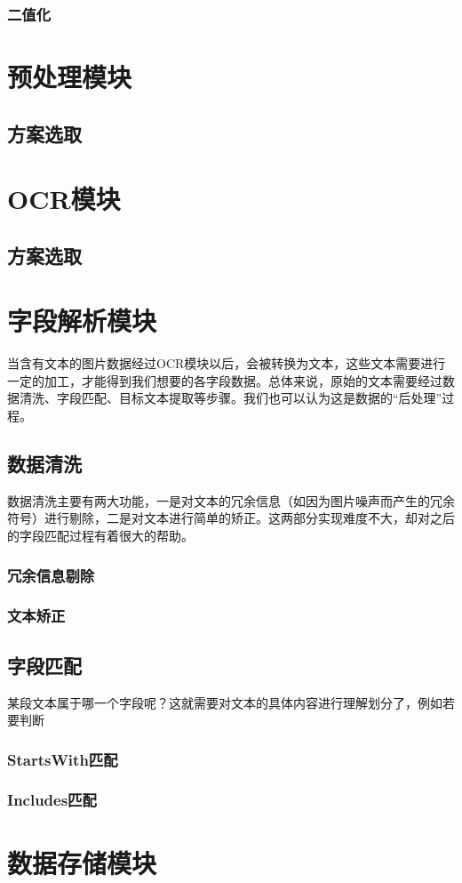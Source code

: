 \subsubsection*{二值化}
\label{sub:二值化}

\section{预处理模块}     %
\subsection{方案选取}


\section{OCR模块}     %
\subsection{方案选取}

\section{字段解析模块}  %
当含有文本的图片数据经过OCR模块以后，会被转换为文本，这些文本需要进行一定的加工，才能得到我们想要的各字段数据。总体来说，原始的文本需要经过数据清洗、字段匹配、目标文本提取等步骤。我们也可以认为这是数据的“后处理”过程。

\subsection{数据清洗}
数据清洗主要有两大功能，一是对文本的冗余信息（如因为图片噪声而产生的冗余符号）进行剔除，二是对文本进行简单的矫正。这两部分实现难度不大，却对之后的字段匹配过程有着很大的帮助。
\subsubsection{冗余信息剔除}
\subsubsection{文本矫正}

\subsection{字段匹配}
某段文本属于哪一个字段呢？这就需要对文本的具体内容进行理解划分了，例如若要判断
\subsubsection{StartsWith匹配}
\subsubsection{Includes匹配}


\section{数据存储模块} %
